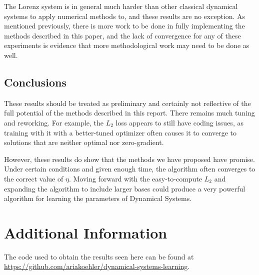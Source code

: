\documentclass[12pt]{article}
\begin{document}
The Lorenz system is in general much harder than other classical dynamical systems to apply numerical methods to, and these results are no exception. As mentioned previously, there is more work to be done in fully implementing the methods described in this paper, and the lack of convergence for any of these experiments is evidence that more methodological work may need to be done as well.



\subsection{Conclusions}

These results should be treated as preliminary and certainly not reflective of the full potential of the methods described in this report. There remains much tuning and reworking. For example, the $L_2$ loss appears to still have coding issues, as training with it with a better-tuned optimizer often causes it to converge to solutions that are neither optimal nor zero-gradient.

However, these results do show that the methods we have proposed have promise. Under certain conditions and given enough time, the algorithm often converges to the correct value of $\eta$. Moving forward with the easy-to-compute $L_2$ and expanding the algorithm to include larger bases could produce a very powerful algorithm for learning the parameters of Dynamical Systems.


\section{Additional Information}

The code used to obtain the results seen here can be found at \url{https://github.com/ariakoehler/dynamical-systems-learning}.







\end{document}
